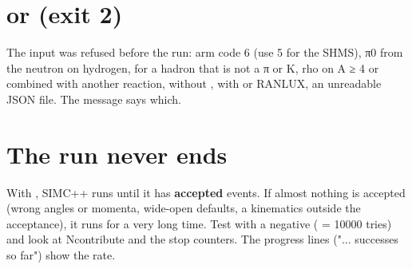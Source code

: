 \section*{\texorpdfstring{ or  (exit 2)}{simc++: input error or configuration error (exit 2)}}\label{user_manual-10u5ffaq:simc-input-error-or-configuration-error-exit-2}
The input was refused before the run: arm code 6 (use 5 for the SHMS), π0 from the neutron on hydrogen, \hyperref[param:doingu5fdecay]{} for a
hadron that is not a π or K, rho on A ≥ 4 or combined with another reaction, \hyperref[param:usingu5ftgtu5ffield]{} without \hyperref[param:tgtu5ffieldu5ffile]{},
 with  or RANLUX, an unreadable JSON file. The message says which.

\section*{\texorpdfstring{The run never ends}{The run never ends}}\label{user_manual-10u5ffaq:the-run-never-ends}
With , SIMC++ runs until it has \hyperref[param:ngen]{} \textbf{accepted} events. If almost nothing is accepted
(wrong angles or momenta, wide-open  defaults, a kinematics outside the acceptance),\allowbreak{} it runs for a very long time.
Test with a negative \hyperref[param:ngen]{} ( = 10000 tries) and look at Ncontribute and the  stop counters. The
progress lines ("... successes so far") show the rate.


